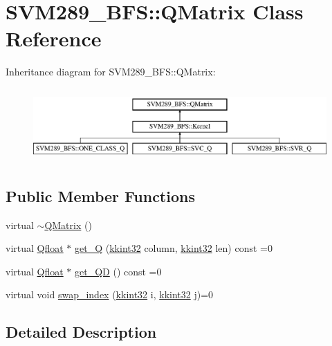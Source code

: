 \hypertarget{class_s_v_m289___b_f_s_1_1_q_matrix}{}\section{S\+V\+M289\+\_\+\+B\+FS\+:\+:Q\+Matrix Class Reference}
\label{class_s_v_m289___b_f_s_1_1_q_matrix}
Inheritance diagram for S\+V\+M289\+\_\+\+B\+FS\+:\+:Q\+Matrix\+:\begin{figure}[H]
\begin{center}
\leavevmode
\includegraphics[height=2.828283cm]{class_s_v_m289___b_f_s_1_1_q_matrix}
\end{center}
\end{figure}
\subsection*{Public Member Functions}
\begin{DoxyCompactItemize}
\item 
virtual \hyperlink{class_s_v_m289___b_f_s_1_1_q_matrix_a72b04b89336d6db4362f887e83b5deaf}{$\sim$\+Q\+Matrix} ()
\item 
virtual \hyperlink{namespace_s_v_m289___b_f_s_a8b0a7657dcefcb6e9a857c9b5e2fd2ef}{Qfloat} $\ast$ \hyperlink{class_s_v_m289___b_f_s_1_1_q_matrix_a5c3621d65b8135452db286640f53cbe0}{get\+\_\+Q} (\hyperlink{namespace_k_k_b_a8fa4952cc84fda1de4bec1fbdd8d5b1b}{kkint32} column, \hyperlink{namespace_k_k_b_a8fa4952cc84fda1de4bec1fbdd8d5b1b}{kkint32} len) const  =0
\item 
virtual \hyperlink{namespace_s_v_m289___b_f_s_a8b0a7657dcefcb6e9a857c9b5e2fd2ef}{Qfloat} $\ast$ \hyperlink{class_s_v_m289___b_f_s_1_1_q_matrix_af3adb6bdfd15b356ee6c834efe58b7a6}{get\+\_\+\+QD} () const  =0
\item 
virtual void \hyperlink{class_s_v_m289___b_f_s_1_1_q_matrix_a49485150269598921a3a53bae3158c30}{swap\+\_\+index} (\hyperlink{namespace_k_k_b_a8fa4952cc84fda1de4bec1fbdd8d5b1b}{kkint32} i, \hyperlink{namespace_k_k_b_a8fa4952cc84fda1de4bec1fbdd8d5b1b}{kkint32} j)=0
\end{DoxyCompactItemize}


\subsection{Detailed Description}


